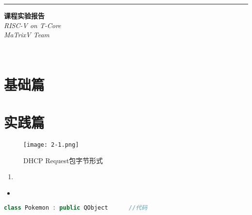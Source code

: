 \documentclass[a4paper, 11pt, oneside]{book} %
\numberwithin{equation}{subsection}
\begin{document}
	\begin{titlepage} %
		
		\raggedleft %
		
		\rule{1pt}{\textheight} %
		\hspace{0.05\textwidth} %
		\parbox[b]{0.75\textwidth}{ %
			
			{\Huge\bfseries  课程实验报告}\\[2\baselineskip] %
			{\LARGE\textit{RISC-V on T-Core}}\\[4\baselineskip] %
			{\Large\textit{MaTrixV Team}} %
			
			\vspace{0.5\textheight} %
			
			{\noindent }\\[\baselineskip] %
		}
	\end{titlepage}
	\tableofcontents
	\section{基础篇}
	\subsection{}
	\section{实践篇}
	
	\begin{figure}[H]
		\centering  
		\texttt{[image: 2-1.png]}   
		\caption{DHCP Request包字节形式}
	\end{figure}

	\begin{enumerate}
		\item 
	\end{enumerate}

	\begin{itemize}
		\item 
	\end{itemize}

	\begin{lstlisting}[language={C++}]
	class Pokemon : public QObject  	//代码
	\end{lstlisting}
	
\end{document}
